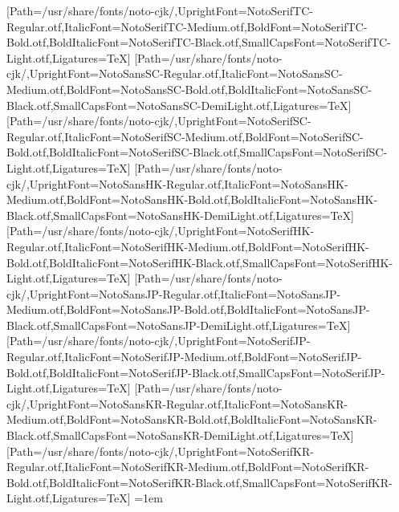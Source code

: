 \newfontfamily{}[Path=/usr/share/fonts/noto-cjk/,UprightFont=NotoSerifTC-Regular.otf,ItalicFont=NotoSerifTC-Medium.otf,BoldFont=NotoSerifTC-Bold.otf,BoldItalicFont=NotoSerifTC-Black.otf,SmallCapsFont=NotoSerifTC-Light.otf,Ligatures=TeX]
\newfontfamily{}[Path=/usr/share/fonts/noto-cjk/,UprightFont=NotoSansSC-Regular.otf,ItalicFont=NotoSansSC-Medium.otf,BoldFont=NotoSansSC-Bold.otf,BoldItalicFont=NotoSansSC-Black.otf,SmallCapsFont=NotoSansSC-DemiLight.otf,Ligatures=TeX]
\newfontfamily{}[Path=/usr/share/fonts/noto-cjk/,UprightFont=NotoSerifSC-Regular.otf,ItalicFont=NotoSerifSC-Medium.otf,BoldFont=NotoSerifSC-Bold.otf,BoldItalicFont=NotoSerifSC-Black.otf,SmallCapsFont=NotoSerifSC-Light.otf,Ligatures=TeX]
\newfontfamily{}[Path=/usr/share/fonts/noto-cjk/,UprightFont=NotoSansHK-Regular.otf,ItalicFont=NotoSansHK-Medium.otf,BoldFont=NotoSansHK-Bold.otf,BoldItalicFont=NotoSansHK-Black.otf,SmallCapsFont=NotoSansHK-DemiLight.otf,Ligatures=TeX]
\newfontfamily{}[Path=/usr/share/fonts/noto-cjk/,UprightFont=NotoSerifHK-Regular.otf,ItalicFont=NotoSerifHK-Medium.otf,BoldFont=NotoSerifHK-Bold.otf,BoldItalicFont=NotoSerifHK-Black.otf,SmallCapsFont=NotoSerifHK-Light.otf,Ligatures=TeX]
\newfontfamily{}[Path=/usr/share/fonts/noto-cjk/,UprightFont=NotoSansJP-Regular.otf,ItalicFont=NotoSansJP-Medium.otf,BoldFont=NotoSansJP-Bold.otf,BoldItalicFont=NotoSansJP-Black.otf,SmallCapsFont=NotoSansJP-DemiLight.otf,Ligatures=TeX]
\newfontfamily{}[Path=/usr/share/fonts/noto-cjk/,UprightFont=NotoSerifJP-Regular.otf,ItalicFont=NotoSerifJP-Medium.otf,BoldFont=NotoSerifJP-Bold.otf,BoldItalicFont=NotoSerifJP-Black.otf,SmallCapsFont=NotoSerifJP-Light.otf,Ligatures=TeX]
\newfontfamily{}[Path=/usr/share/fonts/noto-cjk/,UprightFont=NotoSansKR-Regular.otf,ItalicFont=NotoSansKR-Medium.otf,BoldFont=NotoSansKR-Bold.otf,BoldItalicFont=NotoSansKR-Black.otf,SmallCapsFont=NotoSansKR-DemiLight.otf,Ligatures=TeX]
\newfontfamily{}[Path=/usr/share/fonts/noto-cjk/,UprightFont=NotoSerifKR-Regular.otf,ItalicFont=NotoSerifKR-Medium.otf,BoldFont=NotoSerifKR-Bold.otf,BoldItalicFont=NotoSerifKR-Black.otf,SmallCapsFont=NotoSerifKR-Light.otf,Ligatures=TeX]
\fi\fi\fi\fi\fi\fi\fi
\fi\fi
{}
\emergencystretch=1em
\setlength{\parindent}{0pt}
\everymath{\displaystyle}
\everydisplay{\displaystyle}
\captionsetup{labelformat=empty}
\renewcommand{\maketitle}{
\begin{titlepage}
\begin{center}
\vspace*{\fill}
{\huge \bfseries \thetitle\par}
\vskip 1.5em
{\Large \theauthor\par}
\vskip 1em
{\large \thedate\par}
\vspace*{\fill}
\end{center}
\end{titlepage}
}
